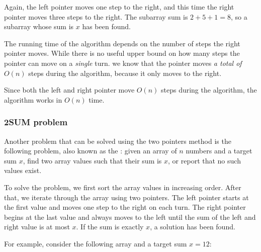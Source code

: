 Again, the left pointer moves one step to the right,
and this time the right pointer moves three
steps to the right.
The subarray sum is $2+5+1=8$, so a subarray
whose sum is $x$ has been found.

\begin{center}
\end{center}

The running time of the algorithm depends on
the number of steps the right pointer moves.
While there is no useful upper bound on how many steps the
pointer can move on a \emph{single} turn.
we know that the pointer moves \emph{a total of}
$O(n)$ steps during the algorithm,
because it only moves to the right.

Since both the left and right pointer
move $O(n)$ steps during the algorithm,
the algorithm works in $O(n)$ time.

\subsubsection{2SUM problem}


Another problem that can be solved using
the two pointers method is the following problem,
also known as the :
given an array of $n$ numbers and
a target sum $x$, find
two array values such that their sum is $x$,
or report that no such values exist.

To solve the problem, we first
sort the array values in increasing order.
After that, we iterate through the array using
two pointers.
The left pointer starts at the first value
and moves one step to the right on each turn.
The right pointer begins at the last value
and always moves to the left until the sum of the
left and right value is at most $x$.
If the sum is exactly $x$,
a solution has been found.

For example, consider the following array
and a target sum $x=12$:
\begin{center}
\end{center}

